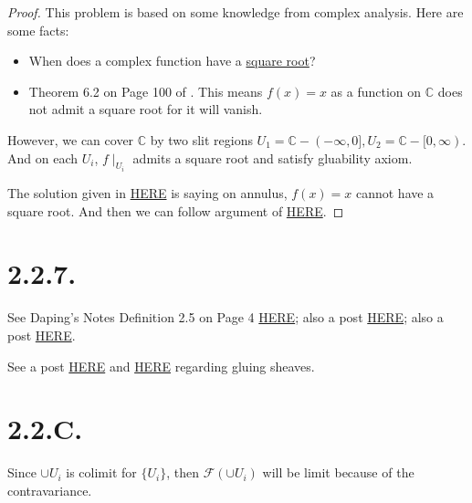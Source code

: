 \begin{proof}
This problem is based on some knowledge from complex analysis. Here are some facts: \begin{itemize}
	\item When does a complex function have a \href{https://math.stackexchange.com/questions/188359/when-does-a-complex-function-have-a-square-root}{square root}?
	\item Theorem 6.2 on Page 100 of \cite{stein2010complex}. This means $f(x)=x$ as a function on $\mathbb C$ does not admit a square root for it will vanish.
\end{itemize}
However, we can cover $\mathbb C$ by two slit regions $U_1=\mathbb C-(-\infty,0],U_2=\mathbb C-[0,\infty)$. And on each $U_i$, $f\mid_{U_i}$ admits a square root and satisfy gluability axiom.

The solution given in \href{https://math.stackexchange.com/questions/38423/presheaf-which-is-not-a-sheaf-holomorphic-functions-which-admit-a-holomorphic}{HERE} is saying on annulus, $f(x)=x$ cannot have a square root. And then we can follow argument of \href{https://math.stackexchange.com/questions/1372943/do-analytic-functions-on-open-subsets-of-mathbbc-with-an-analytic-square-ro}{HERE}.

\end{proof}

\section{2.2.7.}

See Daping's Notes Definition 2.5 on Page 4 \href{http://www.math.uchicago.edu/%7Emay/VIGRE/VIGRE2011/REUPapers/WengD.pdf}{HERE}; also a post \href{https://math.stackexchange.com/questions/4080618/describe-sheaf-properties-via-equalizers}{HERE}; also a post \href{https://math.stackexchange.com/questions/453203/definition-of-sheaf-using-equalizer}{HERE}.

See a post \href{https://math.stackexchange.com/questions/4156317/sheaf-axioms-and-limits-intuition}{HERE} and \href{https://math.stackexchange.com/questions/455706/gluing-sheaves-can-we-realize-mathcalfw-as-some-kind-of-limit}{HERE} regarding gluing sheaves. 

\section{2.2.C.}

Since $\cup U_i$ is colimit for $\{U_i\}$, then $\mathscr F(\cup U_i)$ will be limit because of the contravariance.

